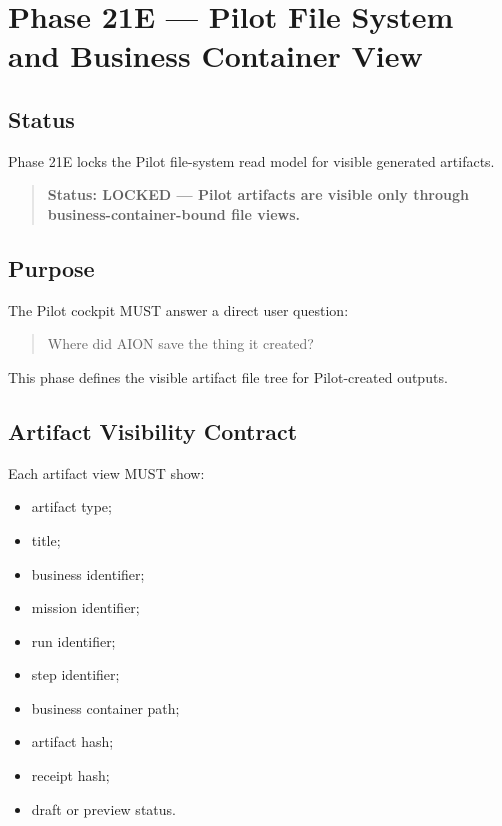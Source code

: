 \section{Phase 21E --- Pilot File System and Business Container View}
\label{sec:aion-phase21e-pilot-filesystem-container-view}

\subsection{Status}

Phase 21E locks the Pilot file-system read model for visible generated artifacts.

\begin{quote}
\textbf{Status: LOCKED --- Pilot artifacts are visible only through business-container-bound file views.}
\end{quote}

\subsection{Purpose}

The Pilot cockpit MUST answer a direct user question:

\begin{quote}
Where did AION save the thing it created?
\end{quote}

This phase defines the visible artifact file tree for Pilot-created outputs.

\subsection{Artifact Visibility Contract}

Each artifact view MUST show:

\begin{itemize}
  \item artifact type;
  \item title;
  \item business identifier;
  \item mission identifier;
  \item run identifier;
  \item step identifier;
  \item business container path;
  \item artifact hash;
  \item receipt hash;
  \item draft or preview status.
\end{itemize}

